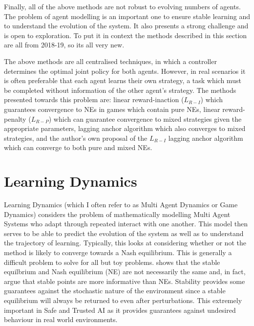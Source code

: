 \documentclass[../sample.tex]{subfiles}
\begin{document}
Finally, all of the above methods are not robust to evolving numbers of agents. The problem of agent
modelling is an important one to ensure stable learning and to understand the evolution of the
system. It also presents a strong challenge and is open to exploration. To put it in context the
methods described in this section are all from 2018-19, so its all very new.

The above methods are all centralised techniques, in which a controller determines the optimal joint
policy for both agents. However, in real scenarios it is often preferable that each agent learns
their own strategy, a task which must be completed without information of the other agent's
strategy. The methods presented towards this problem are: linear reward-inaction ($L_{R-I}$) which
guarantees convergence to NEs in games which contain pure NEs, linear reward-penalty ($L_{R-P}$)
which can guarantee convergence to mixed strategies given the appropriate parameters, lagging anchor
algorithm which also converges to mixed strategies, and the author's own proposal of the $L_{R-I}$
lagging anchor algorithm which can converge to both pure and mixed NEs.


\section{Learning Dynamics}

Learning Dynamics (which I often refer to as Multi Agent Dynamics or Game Dynamics) considers the
problem of mathematically modelling Multi Agent Systems who adapt through repeated interact with one
another. This model then serves to be able to predict the evolution of the system as well as to
understand the trajectory of learning. Typically, this looks at considering whether or not the
method is likely to converge towards a Nash equilibrium. This is generally a difficult problem to
solve \cite{ShohamMultiagentFoundations} for all but toy problems.
\cite{Letcher2019DifferentiableMechanics} shows that the stable equilbrium and Nash equilibrium (NE)
are not necessarily the same and, in fact, argue that stable points are more informative than NEs.
Stability provides some guarantees against the stochastic nature of the environment since a stable
equilibrium will always be returned to even after perturbations. This extremely important in Safe
and Trusted AI as it provides guarantees against undesired behaviour in real world environments.
\end{document}
